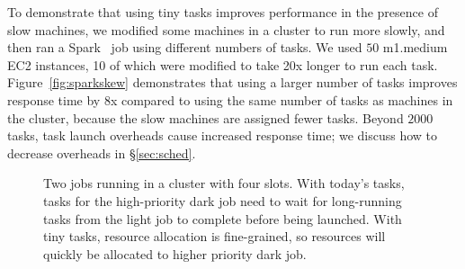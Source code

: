 
To demonstrate that using tiny tasks improves performance in
the presence of slow machines,
we modified some machines in a cluster to run more slowly, and then
ran a Spark~\cite{zaharia2010spark} job using different numbers of tasks.
We used $50$ m1.medium EC2
instances, 10 of which were modified to take 20x longer to run each task.
Figure~\ref{fig:sparkskew} demonstrates that using a larger number of tasks
improves response time by 8x compared to using the same number
of tasks as machines in the cluster, because the slow machines are
assigned fewer tasks. Beyond $2000$ tasks, task launch overheads cause increased response time; we discuss
how to decrease overheads in \S\ref{sec:sched}.

\begin{figure}[t]
\centering
{}
\vspace{-0.1in}
\caption{Two jobs running in a cluster with four slots. With today's tasks,
tasks for the high-priority dark job need to wait for long-running tasks from the light job to
complete before being launched.
With tiny tasks, resource
allocation is fine-grained, so resources will quickly be allocated to
higher priority dark job.}
\vspace{-2ex}
\label{fig:slot_diagram}
\end{figure}


